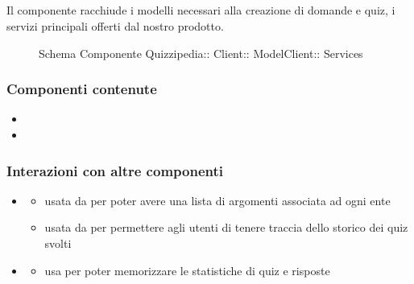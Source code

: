 \subsection{}
Il componente racchiude i modelli necessari alla creazione di domande e quiz, i servizi principali offerti dal nostro prodotto.
\begin{figure}[H]
\centering
\noindent{}
\caption[Schema Componente Services]{Schema Componente Quizzipedia:: Client:: ModelClient:: Services}
\end{figure}
\subsubsection{Componenti contenute}
\begin{itemize}
\item {}
\item {}
\end{itemize}
\subsubsection{Interazioni con altre componenti}
\begin{itemize}
\item {}
\begin{itemize}
\item usata da  per poter avere una lista di argomenti associata ad ogni ente
\item usata da  per permettere agli utenti di tenere traccia dello storico dei quiz svolti
\end{itemize}
\item {}
\begin{itemize}
\item usa  per poter memorizzare le statistiche di quiz e risposte
\end{itemize}
\end{itemize}

